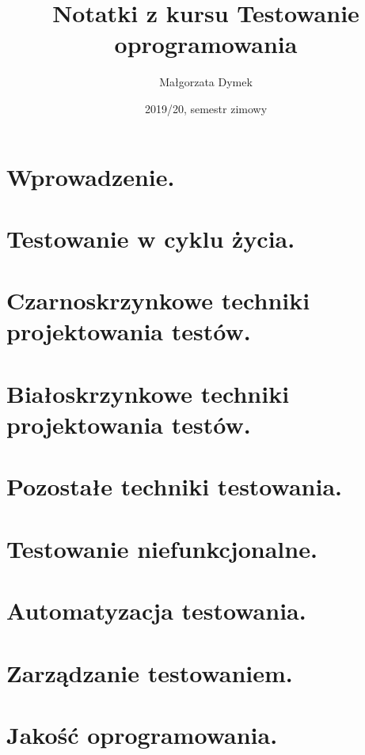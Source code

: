 \documentclass[a4paper]{article}
\title{Notatki z kursu Testowanie oprogramowania}
\author{Małgorzata Dymek}
\date{2019/20, semestr zimowy}
\begin{document}
    \maketitle


    \section{Wprowadzenie.}
    


    \section{Testowanie w cyklu życia.}
    


    \section{Czarnoskrzynkowe techniki projektowania testów.}
    
    


    \section{Białoskrzynkowe techniki projektowania testów.}
    
    


    \section{Pozostałe techniki testowania.}
    


    \section{Testowanie niefunkcjonalne.}
    


    \section{Automatyzacja testowania.}
    


    \section{Zarządzanie testowaniem.}
    
    


    \section{Jakość oprogramowania.}
    
\end{document}
